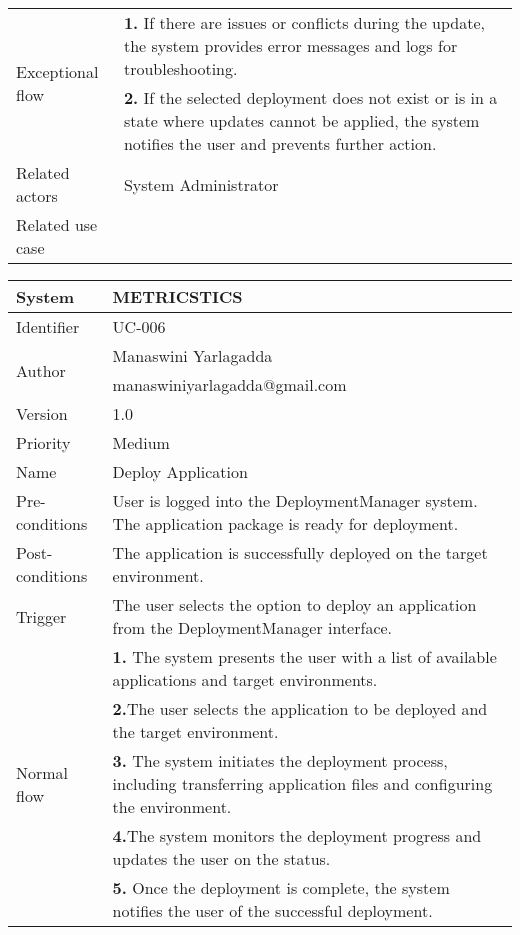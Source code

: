 \begin{table}[htb]
\begin{tabular}{|p{4cm}|p{12cm}|}
        \hline
         \multirow{2}{*}{Exceptional flow} 
        & \textbf{1.}   If there are issues or conflicts during the update, the system provides error messages and logs for troubleshooting. \\ 
        & \textbf{2.} If the selected deployment does not exist or is in a state where updates cannot be applied, the system notifies the user and prevents further action.\\ \hline 
        Related actors & System Administrator \\ \hline
        Related use case &  \\ \hline
    \end{tabular}
    \caption{}
    \label{tab:my_label}
\end{table}

\begin{table}[htb]
    \centering
    \begin{tabular}{|p{4cm}|p{12cm}|} \hline 
         System &  METRICSTICS\\ \hline 
         
         Identifier & UC-006 \\ \hline 
         
         \multirow{2}{*}{Author} & Manaswini Yarlagadda \\
         &manaswiniyarlagadda@gmail.com \\
           \hline 
           Version & 1.0\\ \hline
         
         Priority &  Medium\\ \hline 
         
         Name & Deploy Application \\ \hline 
         Pre-conditions & User is logged into the DeploymentManager system.
The application package is ready for deployment. \\ \hline 
         Post-conditions & The application is successfully deployed on the target environment. \\ \hline
         Trigger & The user selects the option to deploy an application from the DeploymentManager interface. \\ \hline
        \multirow{5}{*}{Normal flow} 
        & \textbf{1.} The system presents the user with a list of available applications and target environments. \\ 
        & \textbf{2.}The user selects the application to be deployed and the target environment.\\
 & \textbf{3.}  The system initiates the deployment process, including transferring application files and configuring the environment. \\ 
        & \textbf{4.}The system monitors the deployment progress and updates the user on the status.\\
 & \textbf{5.}  Once the deployment is complete, the system notifies the user of the successful deployment. \\ 
         

\end{tabular}
\end{table}
